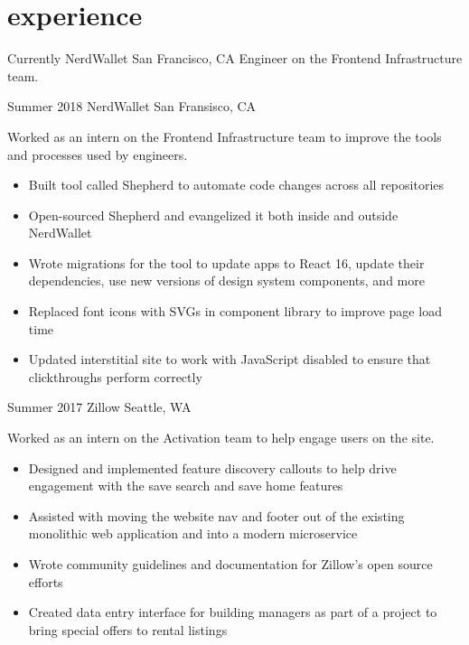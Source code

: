 \documentclass[nofooter]{resume}
\begin{document}

\section{experience}


\begin{entrylist}


\entry
{Currently}
{NerdWallet}
{San Francisco, CA}
{Engineer on the Frontend Infrastructure team.}

\entry
{Summer 2018}
{NerdWallet}
{San Fransisco, CA}
{Worked as an intern on the Frontend Infrastructure team to improve the tools and processes used by engineers.
\noindent\begin{itemize}[leftmargin=0.45cm]
\item Built tool called Shepherd to automate code changes across all repositories
\item Open-sourced Shepherd and evangelized it both inside and outside NerdWallet
\item Wrote migrations for the tool to update apps to React 16, update their dependencies, use new versions of design system components, and more
\item Replaced font icons with SVGs in component library to improve page load time
\item Updated interstitial site to work with JavaScript disabled to ensure that clickthroughs perform correctly
\end{itemize}}

\entry
{Summer 2017}
{Zillow}
{Seattle, WA}
{Worked as an intern on the Activation team to help engage users on the site.
\noindent\begin{itemize}[leftmargin=0.45cm]
\item Designed and implemented feature discovery callouts to help drive engagement with the save search and save home features
\item Assisted with moving the website nav and footer out of the existing monolithic web application and into a modern microservice
\item Wrote community guidelines and documentation for Zillow's open source efforts
\item Created data entry interface for building managers as part of a project to bring special offers to rental listings
\end{itemize}}


\end{entrylist}
\end{document}
